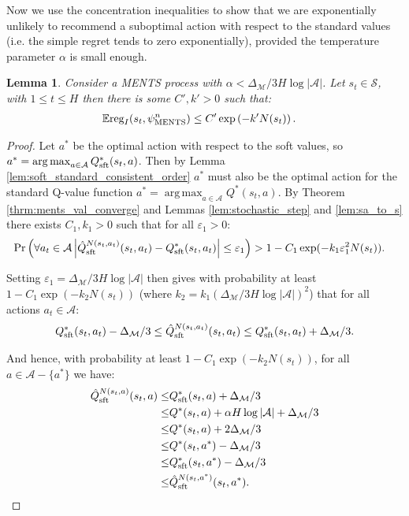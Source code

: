 \documentclass{article}
\newcommand{\bb}[1]{\mathbb{#1}}
\newcommand{\cl}[1]{\mathcal{#1}}
\newcommand{\Qst}[3]{\hat{Q}^{#3}_{\textnormal{sft}}(#1,#2)}
\newcommand{\Qss}[2]{Q^*_{\textnormal{sft}}(#1,#2)}
\newcommand{\reg}{\textnormal{reg}}
\DeclareMathOperator*{\argmax}{arg\,max}
\theoremstyle{plain}
\newtheorem{lemma}[theorem]{Lemma}
\begin{document}
\begin{appendices}
        
    
        Now we use the concentration inequalities to show that we are exponentially unlikely to recommend a suboptimal action with respect to the standard values (i.e. the simple regret tends to zero exponentially), provided the temperature parameter $\alpha$ is small enough.
        
        \begin{lemma} \label{lem:ments_imm_simple_regret}
            Consider a MENTS process with $\alpha<\Delta_{\cl{M}}/3H\log |\cl{A}|$. Let $s_t\in\cl{S}$, with $1\leq t \leq H$ then there is some $C',k'>0$ such that:
            \begin{align}
                \bb{E} \reg_I(s_{t},\psi^n_{\textnormal{MENTS}}) &\leq C'\exp\left( -k' N(s_{t}) \right).
            \end{align}
        \end{lemma}
        \begin{proof}
            Let $a^*$ be the optimal action with respect to the soft values, so $a^*=\argmax_{a\in\cl{A}} \Qss{s_t}{a}$. Then by Lemma \ref{lem:soft_standard_consistent_order} $a^*$ must also be the optimal action for the standard Q-value function $a^*=\argmax_{a\in\cl{A}} Q^*(s_t,a)$. By Theorem \ref{thrm:ments_val_converge} and Lemmas \ref{lem:stochastic_step} and \ref{lem:sa_to_s} there exists $C_1,k_1>0$ such that for all $\varepsilon_1>0$:
            \begin{align}
                \Pr\left(\forall a_t\in\cl{A} \left|\Qst{s_t}{a_t}{N(s_t,a_t)}-\Qss{s_t}{a_t}\right|\leq \varepsilon_1\right) &> 1-C_1 \exp(-k_1 \varepsilon_1^2 N(s_t)).
            \end{align}
            
            Setting $\varepsilon_1=\Delta_{\cl{M}}/3H\log |\cl{A}|$ then gives with probability at least $1-C_1 \exp(-k_2N(s_t))$ (where $k_2=k_1(\Delta_{\cl{M}} /3H\log|\cl{A}|)^2$) that for all actions $a_t\in\cl{A}$:
            \begin{align}
                \Qss{s_t}{a_t} - \Delta_{\cl{M}}/3 \leq \Qst{s_t}{a_t}{N(s_t,a_t)} \leq \Qss{s_t}{a_t} + \Delta_{\cl{M}}/3.
            \end{align}
            
            And hence, with probability at least $1-C_1 \exp(-k_2N(s_t))$, for all $a\in\cl{A}-\{a^*\}$ we have:
            \begin{align}
                \Qst{s_t}{a}{N(s_t,a)}
                    \leq& \Qss{s_t}{a} + \Delta_{\cl{M}}/3 \\
                    \leq& Q^*(s_t,a) + \alpha H\log |\cl{A}| + \Delta_{\cl{M}}/3 \\
                    \leq& Q^*(s_t,a) + 2\Delta_{\cl{M}}/3 \\
                    \leq& Q^*(s_t,a^*) - \Delta_{\cl{M}}/3 \\
                    \leq& \Qss{s_t}{a^*} - \Delta_{\cl{M}}/3 \\
                    \leq& \Qst{s_t}{a^*}{N(s_t,a^*)}. \label{local:nine}
            \end{align}
            

\end{proof}
\end{appendices}
\end{document}
